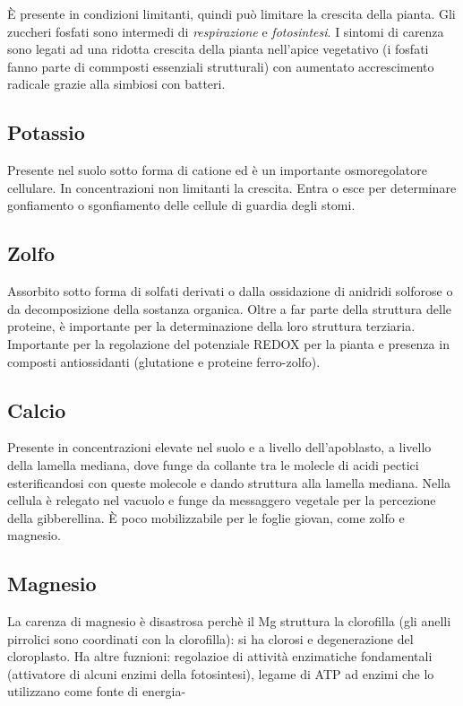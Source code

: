 \documentclass[a4paper,12pt]{book}
\begin{document}
È presente in condizioni limitanti, quindi può limitare la crescita della pianta.
Gli zuccheri fosfati sono intermedi di \emph{respirazione} e \emph{fotosintesi}.
I sintomi di carenza sono legati ad una ridotta crescita della pianta nell'apice vegetativo (i fosfati fanno parte di commposti essenziali strutturali) con aumentato accrescimento radicale grazie alla simbiosi con batteri.

\subsection{Potassio}
Presente nel suolo sotto forma di catione ed è un importante osmoregolatore cellulare. In concentrazioni non limitanti la crescita. Entra o esce per determinare gonfiamento o sgonfiamento delle cellule di guardia degli stomi.

\subsection{Zolfo}
Assorbito sotto forma di solfati derivati o dalla ossidazione di anidridi solforose o da decomposizione della sostanza organica. Oltre a far parte della struttura delle proteine, è importante per la determinazione della loro struttura terziaria. Importante per la regolazione del potenziale REDOX per la pianta e presenza in composti antiossidanti (glutatione e proteine ferro-zolfo).

\subsection{Calcio}
Presente in concentrazioni elevate nel suolo e a livello dell'apoblasto, a livello della lamella mediana, dove funge da collante tra le molecle di acidi pectici esterificandosi con queste molecole e dando struttura alla lamella mediana. Nella cellula è relegato nel vacuolo e funge da messaggero vegetale per la percezione della gibberellina.
È poco mobilizzabile per le foglie giovan, come zolfo e magnesio.

\subsection{Magnesio}
La carenza di magnesio è disastrosa perchè il Mg struttura la clorofilla (gli anelli pirrolici sono coordinati con la clorofilla): si ha clorosi e degenerazione del cloroplasto.
Ha altre fuznioni: regolazioe di attività enzimatiche fondamentali (attivatore di alcuni enzimi della fotosintesi), legame di ATP ad enzimi che lo utilizzano come fonte di energia-
\end{document}
